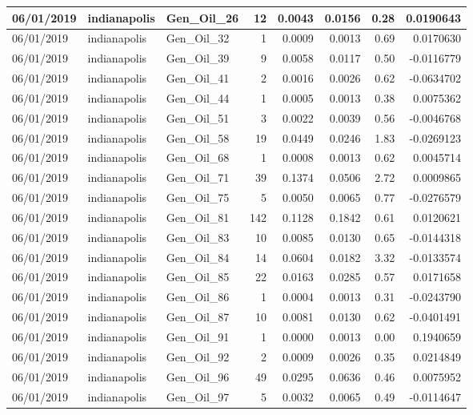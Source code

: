 \documentclass[
  letterpaper,
  DIV=11,
  numbers=noendperiod]{scrartcl}
\begin{document}
\begin{tabular}{l|l|l|r|r|r|r|r}
\hline
06/01/2019 & indianapolis & Gen\_Oil\_26 & 12 & 0.0043 & 0.0156 & 0.28 & 0.0190643\\
\hline
06/01/2019 & indianapolis & Gen\_Oil\_32 & 1 & 0.0009 & 0.0013 & 0.69 & 0.0170630\\
\hline
06/01/2019 & indianapolis & Gen\_Oil\_39 & 9 & 0.0058 & 0.0117 & 0.50 & -0.0116779\\
\hline
06/01/2019 & indianapolis & Gen\_Oil\_41 & 2 & 0.0016 & 0.0026 & 0.62 & -0.0634702\\
\hline
06/01/2019 & indianapolis & Gen\_Oil\_44 & 1 & 0.0005 & 0.0013 & 0.38 & 0.0075362\\
\hline
06/01/2019 & indianapolis & Gen\_Oil\_51 & 3 & 0.0022 & 0.0039 & 0.56 & -0.0046768\\
\hline
06/01/2019 & indianapolis & Gen\_Oil\_58 & 19 & 0.0449 & 0.0246 & 1.83 & -0.0269123\\
\hline
06/01/2019 & indianapolis & Gen\_Oil\_68 & 1 & 0.0008 & 0.0013 & 0.62 & 0.0045714\\
\hline
06/01/2019 & indianapolis & Gen\_Oil\_71 & 39 & 0.1374 & 0.0506 & 2.72 & 0.0009865\\
\hline
06/01/2019 & indianapolis & Gen\_Oil\_75 & 5 & 0.0050 & 0.0065 & 0.77 & -0.0276579\\
\hline
06/01/2019 & indianapolis & Gen\_Oil\_81 & 142 & 0.1128 & 0.1842 & 0.61 & 0.0120621\\
\hline
06/01/2019 & indianapolis & Gen\_Oil\_83 & 10 & 0.0085 & 0.0130 & 0.65 & -0.0144318\\
\hline
06/01/2019 & indianapolis & Gen\_Oil\_84 & 14 & 0.0604 & 0.0182 & 3.32 & -0.0133574\\
\hline
06/01/2019 & indianapolis & Gen\_Oil\_85 & 22 & 0.0163 & 0.0285 & 0.57 & 0.0171658\\
\hline
06/01/2019 & indianapolis & Gen\_Oil\_86 & 1 & 0.0004 & 0.0013 & 0.31 & -0.0243790\\
\hline
06/01/2019 & indianapolis & Gen\_Oil\_87 & 10 & 0.0081 & 0.0130 & 0.62 & -0.0401491\\
\hline
06/01/2019 & indianapolis & Gen\_Oil\_91 & 1 & 0.0000 & 0.0013 & 0.00 & 0.1940659\\
\hline
06/01/2019 & indianapolis & Gen\_Oil\_92 & 2 & 0.0009 & 0.0026 & 0.35 & 0.0214849\\
\hline
06/01/2019 & indianapolis & Gen\_Oil\_96 & 49 & 0.0295 & 0.0636 & 0.46 & 0.0075952\\
\hline
06/01/2019 & indianapolis & Gen\_Oil\_97 & 5 & 0.0032 & 0.0065 & 0.49 & -0.0114647\\

\end{tabular}
\end{document}
